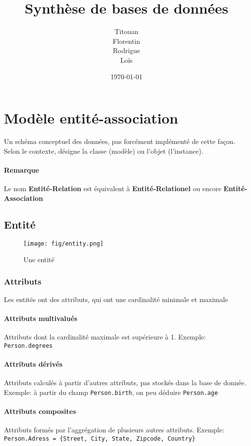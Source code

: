 \documentclass[a4paper]{article}
\author{Titouan \bsc{Christophe}\\Florentin \bsc{Hennecker}\\Rodrigue \bsc{Van Brande}\\Loïs \bsc{Postula}}
\title{Synthèse de bases de données}
\date{\today}
\begin{document}
\maketitle
\tableofcontents

\section{Modèle entité-association}
Un schéma conceptuel des données, pas forcément implémenté de cette façon.
Selon le contexte, désigne la classe (modèle) ou l'objet (l'instance).

\paragraph{Remarque} Le nom \textbf{Entité-Relation} est équivalent à
\textbf{Entité-Relationel} ou encore \textbf{Entité-Association}

\subsection{Entité}
\begin{figure}[H]
    \center
    \texttt{[image: fig/entity.png]}
    \caption{Une entité}
\end{figure}

\subsubsection{Attributs}
Les entités ont des attributs, qui ont une cardinalité minimale et maximale

\paragraph{Attributs multivalués}
Attributs dont la cardinalité maximale est supérieure à 1.
Exemple: \texttt{Person.degrees}

\paragraph{Attributs dérivés}
Attributs calculés à partir d'autres attributs, pas stockés dans la base de donnée.
Exemple: à partir du champ \texttt{Person.birth}, on peu déduire \texttt{Person.age}

\paragraph{Attributs composites}
Attributs formés par l'aggrégation de plusieurs autres attributs.
Exemple: \texttt{Person.Adress = \{Street, City, State, Zipcode, Country\}}
\end{document}
